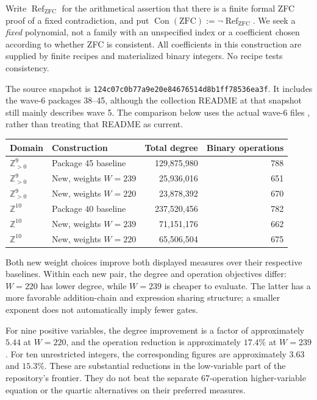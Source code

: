 \documentclass[11pt]{article}
\theoremstyle{definition}\newtheorem{definition}[theorem]{Definition}
\newcommand{\Z}{\mathbb Z}\newcommand{\N}{\mathbb N}\newcommand{\Pos}{\mathbb Z_{>0}}
\newcommand{\Con}{\operatorname{Con}(\mathrm{ZFC})}
\newcommand{\ZRef}{\operatorname{Ref}_{\mathrm{ZFC}}}
\newcommand{\pin}{\texttt{124c07c0b77a9e20e84676514d8b1ff78536ea3f}}
\begin{document}
Write $\ZRef$ for the arithmetical assertion that there is a finite formal
ZFC proof of a fixed contradiction, and put $\Con:=\neg\ZRef$. We seek a
\emph{fixed} polynomial, not a family with an unspecified index or a
coefficient chosen according to whether ZFC is consistent.
All coefficients in this construction are supplied by finite recipes and
materialized binary integers. No recipe tests consistency.

The source snapshot is \pin. It includes the wave-6 packages 38--45,
although the collection README at that snapshot still mainly describes
wave 5. The comparison below uses the actual wave-6 files
\cite{source40,source45}, rather than treating that README as current.

\begin{center}\small
\begin{tabular}{@{}llrr@{}}
\toprule
Domain & Construction & Total degree & Binary operations\\
\midrule
$\Pos^9$ & Package 45 baseline & 129,875,980 & 788\\
$\Pos^9$ & New, weights $W=239$ & 25,936,016 & 651\\
$\Pos^9$ & New, weights $W=220$ & 23,878,392 & 670\\
\midrule
$\Z^{10}$ & Package 40 baseline & 237,520,456 & 782\\
$\Z^{10}$ & New, weights $W=239$ & 71,151,176 & 662\\
$\Z^{10}$ & New, weights $W=220$ & 65,506,504 & 675\\
\bottomrule
\end{tabular}
\end{center}

Both new weight choices improve both displayed measures over their
respective baselines. Within each new pair, the degree and operation
objectives differ: $W=220$ has lower degree, while $W=239$ is cheaper to
evaluate. The latter has a more favorable addition-chain and expression
sharing structure; a smaller exponent does not automatically imply fewer
gates.

For nine positive variables, the degree improvement is a factor of
approximately $5.44$ at $W=220$, and the operation reduction is approximately
$17.4\%$ at $W=239$. For ten unrestricted integers, the corresponding
figures are approximately $3.63$ and $15.3\%$.
These are substantial reductions in the low-variable part of the
repository's frontier. They do not beat the separate 67-operation
higher-variable equation or the quartic alternatives on their preferred
measures.
\end{document}
